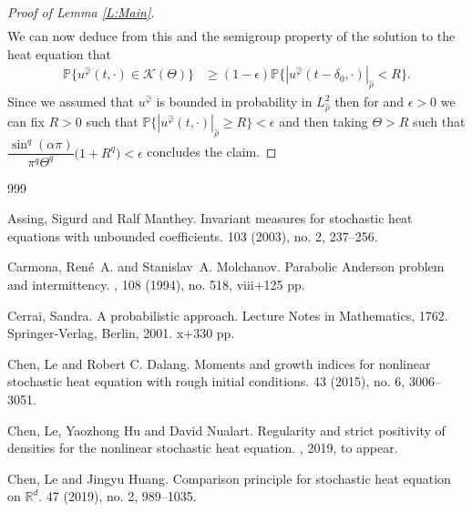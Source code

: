 \documentclass[a4paper,11pt]{article}%
\numberwithin{equation}{section}
\theoremstyle{plain}
\theoremstyle{definition}
\newcommand{\R}{\mathbb{R}}
\begin{document}
\begin{proof}[Proof of Lemma \ref{L:Main}]
\begin{align*}
\end{align*}
We can now deduce from this and the semigroup property of the solution to the heat equation that
\begin{align*}
\mathbb{P}\{ u^{\hat{\varphi}}(t,\cdot) \in \mathscr K(\Theta) \} & \ge (1-
\epsilon)\mathbb{P}\{ |u^{\hat{\varphi}}(t-\delta_0,\cdot)|_{\hat\rho} < R
\}.
\end{align*}
Since we assumed that $u^{\hat \varphi}$ is bounded in probability in $L^2_{\hat \rho}$ then for and $\epsilon >0$ we can fix $R>0$ such that $\mathbb{P}\{ |u^{\hat{\varphi}}(t,\cdot)|_{\hat\rho} \ge R \} < \epsilon$ and then taking $\Theta > R$ such that $ \dfrac{\sin^q(\alpha \pi)}{\pi^q \Theta^q}\bigg( 1+ R^q \bigg) < \epsilon$ concludes the claim.
\end{proof}

\begin{small}
\begin{thebibliography}{999}

Assing, Sigurd and Ralf Manthey.
\newblock Invariant measures for stochastic heat equations with unbounded coefficients.
 103 (2003), no. 2, 237--256.

Carmona, Ren\'e~A.  and Stanislav~A. Molchanov.
\newblock Parabolic Anderson problem and intermittency.
, 108 (1994), no. 518, viii+125 pp.

Cerrai, Sandra.
\newblock A probabilistic approach. Lecture Notes in Mathematics, 1762. Springer-Verlag, Berlin, 2001. x+330 pp.

Chen, Le and Robert C. Dalang.
\newblock Moments and growth indices for nonlinear stochastic heat equation
with rough initial conditions.
  43 (2015), no. 6, 3006--3051.

Chen, Le, Yaozhong Hu and David Nualart.
\newblock Regularity and strict positivity of densities for the nonlinear stochastic heat equation.
, 2019, to appear.

Chen, Le and Jingyu Huang.
\newblock Comparison principle for stochastic heat equation on $\R^d$.
  47 (2019), no. 2, 989--1035.


\end{thebibliography}
\end{small}
\end{document}
